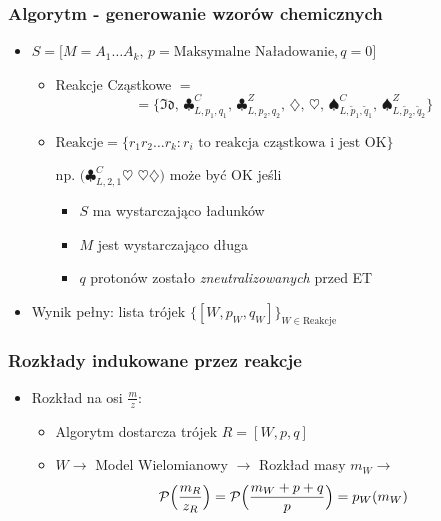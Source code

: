 \documentclass[xetex]{beamer}
\begin{document}
	\begin{frame}\frametitle{Algorytm - generowanie wzorów chemicznych}

		\begin{itemize}
			\item $S = \Big[M = A_1 \dots A_k,\, p = \text{Maksymalne Naładowanie}, q = 0\Big]$

			\begin{itemize}
			
				\item Reakcje Cząstkowe $ = $ 
					$$ = \{ 
					\mathfrak{Id},\,
					\clubsuit^C_{L , p_1, q_1},\,
					\clubsuit^Z_{L,p_2, q_2},\, 
					\diamondsuit,\, 
					\heartsuit,\, 
					\spadesuit^C_{L,\tilde{p}_1, \tilde{q}_1},\, 
					\spadesuit^Z_{L,\tilde{p}_2, \tilde{q}_2} \} $$
				\item  
					$ \text{Reakcje}= \{ r_1 r_2 \dots r_k : r_i \text{ to reakcja cząstkowa i jest OK} \} $
				\item[np.] $\Big(\clubsuit^C_{L, 2,1} \heartsuit$ $\heartsuit \diamondsuit\Big)$ może być OK jeśli 

				\begin{itemize}
					\item $S$ ma wystarczająco ładunków
					\item $M$ jest wystarczająco długa
					\item $q$ protonów zostało {\it zneutralizowanych} przed ET 
				\end{itemize}
			
			\end{itemize}

			\item 	Wynik pełny: lista trójek $\Biggl\{[W, p_W, q_W]\Biggl\}_{W \in \text{Reakcje}}$  
		\end{itemize}
	\end{frame}

	
	\begin{frame}\frametitle{Rozkłady indukowane przez reakcje}
		\begin{itemize}
			\item Rozkład na osi $\frac{m}{z}$: 
	
			\begin{itemize}
				\item 	Algorytm dostarcza trójek $R = [ W, p, q]$ 
				\item 	$W \rightarrow$ Model Wielomianowy $\rightarrow$ Rozkład masy $m_W \rightarrow$ 
					$$ \mathcal{P}\Big(\frac{m_R}{z_R}\Big)  = \mathcal{P}\Big(\frac{m_W + p + q}{p}\Big) = p_W (m_W)$$
			\end{itemize}

		\end{itemize}
	\end{frame}
\end{document}
